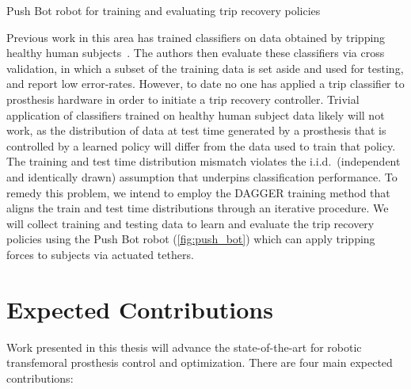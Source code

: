 \begin{marginfigure}
    \centering
    \caption{Push Bot robot for training and evaluating trip recovery policies}
    \label{fig:push_bot}
\end{marginfigure}
Previous work in this area has trained classifiers on data obtained by tripping
healthy human subjects~\citep{lawson2010stumble, shirota2014recovery}. The
authors then evaluate these classifiers via cross validation, in which a subset
of the training data is set aside and used for testing, and report low
error-rates.  However, to date no one has applied a trip classifier to
prosthesis hardware in order to initiate a trip recovery controller. Trivial
application of classifiers trained on healthy human subject data likely will not
work, as the distribution of data at test time generated by a prosthesis that is
controlled by a learned policy will differ from the data used to train that
policy. The training and test time distribution mismatch violates the i.i.d.\
(independent and identically drawn) assumption that underpins classification
performance. To remedy this problem, we intend to employ the DAGGER training
method \citep{ross2011reduction} that aligns the train and test time
distributions through an iterative procedure. We will collect training and
testing data to learn and evaluate the trip recovery policies using the Push Bot
robot (\cref{fig:push_bot}) which can apply tripping forces to subjects via
actuated tethers.

\section{Expected Contributions}

Work presented in this thesis will advance the state-of-the-art for robotic
transfemoral prosthesis control and optimization. There are four main expected 
contributions: 

